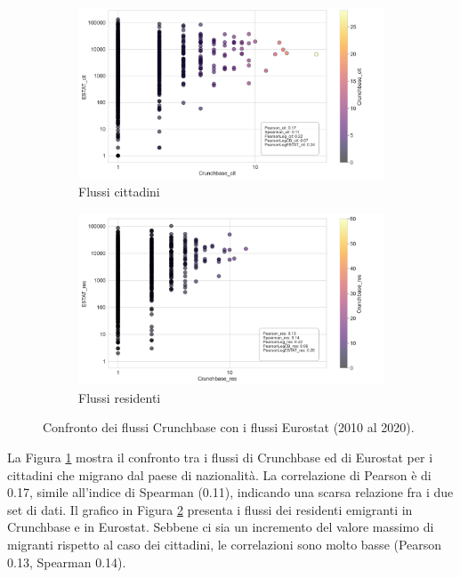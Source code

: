 \begin{figure}[ht]
    \centering
    \begin{subfigure}{\textwidth}
        \centering
        \includegraphics[width=1.0\textwidth]{images/flows/original/ESTAT_cit_False.png}
        \caption{Flussi cittadini}
        \label{fig:estatcrunchfalse_cit}
    \end{subfigure}
    \begin{subfigure}{\textwidth}
        \centering
        \includegraphics[width=1.0\textwidth]{images/flows/original/ESTAT_res_False.png}
        \caption{Flussi residenti}
        \label{fig:estatcrunchfalse_res}
    \end{subfigure}
    \caption{Confronto dei flussi Crunchbase con i flussi Eurostat (2010 al 2020).}
    \label{fig:estatcrunchfalse}
\end{figure}
\par 
La Figura \ref{fig:estatcrunchfalse_cit} mostra il confronto tra i flussi di Crunchbase ed di Eurostat per i cittadini che migrano dal paese di nazionalità. La correlazione di Pearson è di 0.17, simile all'indice di Spearman (0.11), indicando una scarsa relazione fra i due set di dati.
Il grafico in Figura \ref{fig:estatcrunchfalse_res} presenta i flussi dei residenti emigranti in Crunchbase e in  Eurostat. Sebbene ci sia un incremento del valore massimo di migranti rispetto al caso dei cittadini, le correlazioni sono molto basse (Pearson 0.13, Spearman 0.14). 
